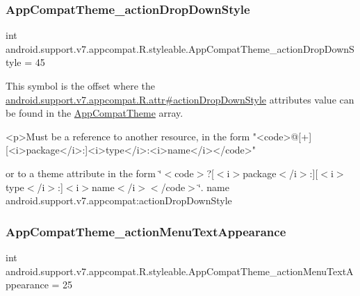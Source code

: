 \subsubsection{\texorpdfstring{App\+Compat\+Theme\+\_\+action\+Drop\+Down\+Style}{AppCompatTheme\_actionDropDownStyle}}
{\footnotesize\ttfamily int android.\+support.\+v7.\+appcompat.\+R.\+styleable.\+App\+Compat\+Theme\+\_\+action\+Drop\+Down\+Style = 45\hspace{0.3cm}{\ttfamily [static]}}

This symbol is the offset where the \hyperlink{classandroid_1_1support_1_1v7_1_1appcompat_1_1R_1_1attr_ad8381a94ffd2505e02cb8ebd52e55328}{android.\+support.\+v7.\+appcompat.\+R.\+attr\#action\+Drop\+Down\+Style} attribute\textquotesingle{}s value can be found in the \hyperlink{classandroid_1_1support_1_1v7_1_1appcompat_1_1R_1_1styleable_a5c42f89e8a410c323be34208d75c430b}{App\+Compat\+Theme} array.

\begin{DoxyVerb}      <p>Must be a reference to another resource, in the form "<code>@[+][<i>package</i>:]<i>type</i>:<i>name</i></code>"
\end{DoxyVerb}
 or to a theme attribute in the form \char`\"{}$<$code$>$?\mbox{[}$<$i$>$package$<$/i$>$\+:\mbox{]}\mbox{[}$<$i$>$type$<$/i$>$\+:\mbox{]}$<$i$>$name$<$/i$>$$<$/code$>$\char`\"{}.  name android.\+support.\+v7.\+appcompat\+:action\+Drop\+Down\+Style \mbox{\label{classandroid_1_1support_1_1v7_1_1appcompat_1_1R_1_1styleable_a08537df420a6180fa4bf7a612fafbef4}} 
\subsubsection{\texorpdfstring{App\+Compat\+Theme\+\_\+action\+Menu\+Text\+Appearance}{AppCompatTheme\_actionMenuTextAppearance}}
{\footnotesize\ttfamily int android.\+support.\+v7.\+appcompat.\+R.\+styleable.\+App\+Compat\+Theme\+\_\+action\+Menu\+Text\+Appearance = 25\hspace{0.3cm}{\ttfamily [static]}}


